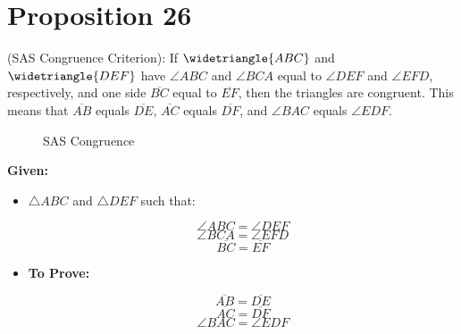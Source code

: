 
\section*{Proposition 26}

\begin{thm}
(SAS Congruence Criterion):
If $\widetriangle{ABC}$ and $\widetriangle{DEF}$ have $\angle{ABC}$ and $\angle{BCA}$ equal to $\angle{DEF}$ and $\angle{EFD}$, respectively, and one side $\overline{BC}$ equal to $\overline{EF}$, then the triangles are congruent. This means that $\overline{AB}$ equals $\overline{DE}$, $\overline{AC}$ equals $\overline{DF}$, and $\angle{BAC}$ equals $\angle{EDF}$.
\end{thm}

\begin{figure}[H]
	\begin{subfigure}{0.35\textwidth}
		\caption{}
	\end{subfigure}
	\begin{subfigure}{0.35\textwidth}
		\caption{}
	\end{subfigure}
	\caption{SAS Congruence}
\end{figure}

\textbf{Given:} 

\begin{itemize}

\item $\triangle{ABC}$ and $\triangle{DEF}$ such that:
  
    \[\angle{ABC} = \angle{DEF}\]
    \[\angle{BCA} = \angle{EFD}\]
    \[\overline{BC} = \overline{EF}\]

\item \textbf{To Prove:} 

  \[\overline{AB} = \overline{DE}\]
  \[\overline{AC} = \overline{DF}\]
  \[\angle{BAC} = \angle{EDF}\]
  
  \end{itemize}
  
  \clearpage
  
